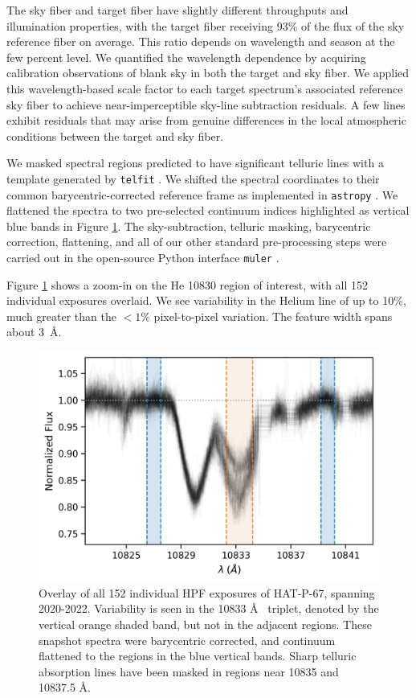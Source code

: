 \documentclass[twocolumn]{aastex631}
\begin{document}
The sky fiber and target fiber have slightly different throughputs and illumination properties, with the target fiber receiving $93\%$ of the flux of the sky reference fiber on average.  This ratio depends on wavelength and season at the few percent level.  We quantified the wavelength dependence by acquiring calibration observations of blank sky in both the target and sky fiber.  We applied this wavelength-based scale factor to each target spectrum's associated reference sky fiber to achieve near-imperceptible sky-line subtraction residuals.  A few lines exhibit residuals that may arise from genuine differences in the local atmospheric conditions between the target and sky fiber.

We masked spectral regions predicted to have significant telluric lines with a template generated by \texttt{telfit} \citep{2014AJ....148...53G}.  We shifted the spectral coordinates to their common barycentric-corrected reference frame \citep{2014PASP..126..838W} as implemented in \texttt{astropy} \citep{2013A&A...558A..33A,2018AJ....156..123A,2022ApJ...935..167A}.  We flattened the spectra to two pre-selected continuum indices highlighted as vertical blue bands in Figure \ref{fig:HPFheliumOverview}.  The sky-subtraction, telluric masking, barycentric correction, flattening, and all of our other standard pre-processing steps were carried out in the open-source Python interface \texttt{muler} \citep{2022JOSS....7.4302G}.

Figure \ref{fig:HPFheliumOverview} shows a zoom-in on the He 10830 region of interest, with all 152 individual exposures overlaid.  We see variability in the Helium line of up to 10\%, much greater than the $<1\%$ pixel-to-pixel variation.  The feature width spans about 3~\AA.

\begin{figure}
    \includegraphics[width=\linewidth]{figures/HAT_P_67b_He_spectrum.png}
    \caption{Overlay of all 152 individual HPF exposures of HAT-P-67, spanning 2020-2022. Variability is seen in the  10833 \AA~ triplet, denoted by the vertical orange shaded band, but not in the adjacent regions.  These snapshot spectra were barycentric corrected, and continuum flattened to the regions in the blue vertical bands.  Sharp telluric absorption lines have been masked in regions near 10835 and 10837.5 \AA.}
    \label{fig:HPFheliumOverview}
\end{figure}
\end{document}
